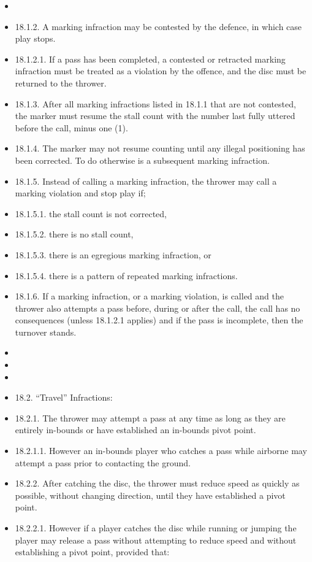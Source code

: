 \begin{itemize}
    \item 
    \item 18.1.2. A marking infraction may be contested by the defence, in which case play stops.
    \item 18.1.2.1. If a pass has been completed, a contested or retracted marking infraction must be treated as a violation by the offence, and the disc must be returned to the thrower.
    \item 18.1.3. After all marking infractions listed in 18.1.1 that are not contested, the marker must resume the stall count with the number last fully uttered before the call, minus one (1).
    \item 18.1.4. The marker may not resume counting until any illegal positioning has been corrected. To do otherwise is a subsequent marking infraction.
    \item 18.1.5. Instead of calling a marking infraction, the thrower may call a marking violation and stop play if;
    \item 18.1.5.1. the stall count is not corrected,
    \item 18.1.5.2. there is no stall count,
    \item 18.1.5.3. there is an egregious marking infraction, or
    \item 18.1.5.4. there is a pattern of repeated marking infractions.
    \item 18.1.6. If a marking infraction, or a marking violation, is called and the thrower also attempts a pass before, during or after the call, the call has no consequences (unless 18.1.2.1 applies) and if the pass is incomplete, then the turnover stands.
    \item 
    \item 
    \item 
    \item 18.2. “Travel” Infractions:
    \item 18.2.1. The thrower may attempt a pass at any time as long as they are entirely in-bounds or have established an in-bounds pivot point.
    \item 18.2.1.1. However an in-bounds player who catches a pass while airborne may attempt a pass prior to contacting the ground.
    \item 18.2.2. After catching the disc, the thrower must reduce speed as quickly as possible, without changing direction, until they have established a pivot point.
    \item 18.2.2.1. However if a player catches the disc while running or jumping the player may release a pass without attempting to reduce speed and without establishing a pivot point, provided that:

\end{itemize}
